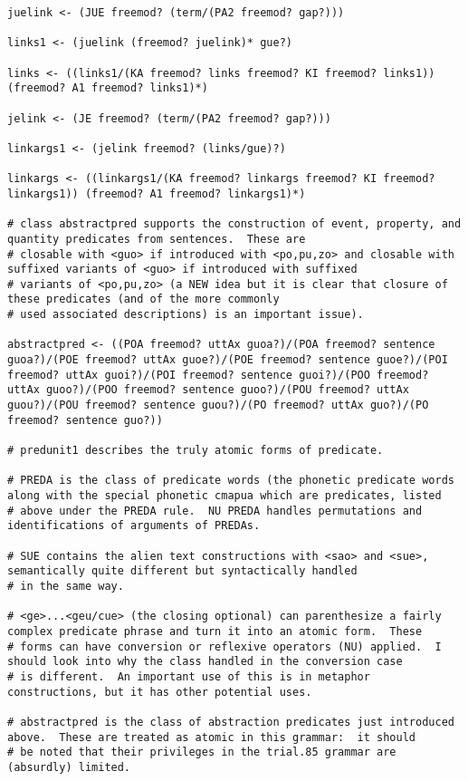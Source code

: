 \documentclass[12pt]{book}
\begin{document}
{\begin{verbatim}
juelink <- (JUE freemod? (term/(PA2 freemod? gap?)))

links1 <- (juelink (freemod? juelink)* gue?)

links <- ((links1/(KA freemod? links freemod? KI freemod? links1)) (freemod? A1 freemod? links1)*)

jelink <- (JE freemod? (term/(PA2 freemod? gap?)))

linkargs1 <- (jelink freemod? (links/gue)?)

linkargs <- ((linkargs1/(KA freemod? linkargs freemod? KI freemod? linkargs1)) (freemod? A1 freemod? linkargs1)*)

# class abstractpred supports the construction of event, property, and quantity predicates from sentences.  These are
# closable with <guo> if introduced with <po,pu,zo> and closable with suffixed variants of <guo> if introduced with suffixed
# variants of <po,pu,zo> (a NEW idea but it is clear that closure of these predicates (and of the more commonly
# used associated descriptions) is an important issue).

abstractpred <- ((POA freemod? uttAx guoa?)/(POA freemod? sentence guoa?)/(POE freemod? uttAx guoe?)/(POE freemod? sentence guoe?)/(POI freemod? uttAx guoi?)/(POI freemod? sentence guoi?)/(POO freemod? uttAx guoo?)/(POO freemod? sentence guoo?)/(POU freemod? uttAx guou?)/(POU freemod? sentence guou?)/(PO freemod? uttAx guo?)/(PO freemod? sentence guo?))

# predunit1 describes the truly atomic forms of predicate.

# PREDA is the class of predicate words (the phonetic predicate words along with the special phonetic cmapua which are predicates, listed
# above under the PREDA rule.  NU PREDA handles permutations and identifications of arguments of PREDAs.

# SUE contains the alien text constructions with <sao> and <sue>, semantically quite different but syntactically handled
# in the same way.

# <ge>...<geu/cue> (the closing optional) can parenthesize a fairly complex predicate phrase and turn it into an atomic form.  These
# forms can have conversion or reflexive operators (NU) applied.  I should look into why the class handled in the conversion case
# is different.  An important use of this is in metaphor constructions, but it has other potential uses.

# abstractpred is the class of abstraction predicates just introduced above.  These are treated as atomic in this grammar:  it should
# be noted that their privileges in the trial.85 grammar are (absurdly) limited.


\end{verbatim}}
\end{document}
